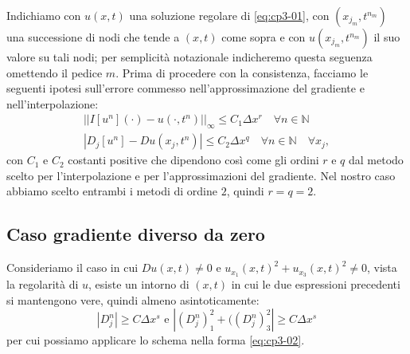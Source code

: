 Indichiamo con $u(x,t)$ una soluzione regolare di \eqref{eq:cp3-01}, con $(x_{j_m},t^{n_m})$ una successione di nodi che tende a $(x,t)$ come sopra e con $u(x_{j_m},t^{n_m})$ il suo valore su tali nodi; per semplicità notazionale indicheremo questa seguenza omettendo il pedice $m$.
Prima di procedere con la consistenza, facciamo le seguenti ipotesi sull'errore commesso nell'approssimazione del gradiente e nell'interpolazione:
\begin{gather}
\label{eq:cp3-04}
||I[u^n](\cdot)-u(\cdot,t^n)||_{\infty}\le C_1\Delta x^r\quad\forall n\in\mathbb{N} \\
\label{eq:cp3-05}
|D_j[u^n]-Du(x_j,t^n)|\le C_2\Delta x^q\quad\forall n\in\mathbb{N}\quad\forall x_j, 
\end{gather}
con $C_1$ e $C_2$ costanti positive che dipendono così come gli ordini $r$ e $q$ dal metodo scelto per l'interpolazione e per l'approssimazioni del gradiente. Nel nostro caso abbiamo scelto entrambi i metodi di ordine $2$, quindi $r=q=2$.

%
\subsection{Caso gradiente diverso da zero}
\label{subsec:cp3-sc2-1}
Consideriamo il caso in cui $Du(x,t)\ne 0$ e $u_{x_1}(x,t)^2+u_{x_3}(x,t)^2\ne 0$, vista la regolarità di $u$, esiste un intorno di $(x,t)$ in cui le due espressioni precedenti si mantengono vere, quindi almeno asintoticamente:
\begin{equation}
  \label{eq:cp3-sc21-01}
|D_j^n|\ge C\Delta x^s\text{ e }|(D_j^n)_1^2+((D_j^n)_3^2|\ge C\Delta x^s
\end{equation}
per cui possiamo applicare lo schema nella forma \eqref{eq:cp3-02}.

